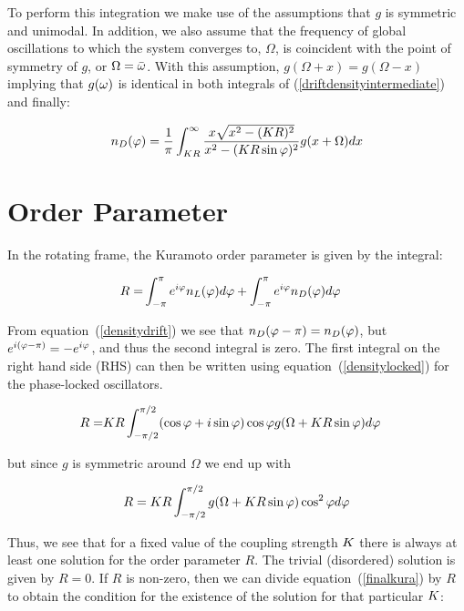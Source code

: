 To perform this integration we make use of the assumptions that $g$ is symmetric and unimodal. In addition, we also assume that the
frequency of global oscillations to which the system converges to, $\Omega$, is coincident with the point of symmetry of $g$, or
$\Omega=\bar{\omega}$. With this assumption, $g(\Omega + x) = g(\Omega - x)$ implying that $g(\omega)$ is identical in both integrals
of (\ref{driftdensityintermediate}) and finally:

\begin{align}
    n_D(\varphi) = \frac{1}{\pi}\int_{K R}^\infty \frac{x\sqrt{x^2 - (K R)^2}}{x^2 - (K R\sin\varphi)^2}g(x+\Omega)dx
    \label{densitydrift}
\end{align}


\section{Order Parameter}


In the rotating frame, the Kuramoto order parameter is given by the integral:

\begin{align}
    R = &\int_{-\pi}^{\pi} e^{i\varphi}n_L(\varphi)d\varphi + \int_{-\pi}^{\pi} e^{i\varphi}n_D(\varphi)d\varphi
\end{align}

From equation~(\ref{densitydrift}) we see that $n_D(\varphi - \pi) = n_D(\varphi)$, but $e^{i(\varphi - \pi)} = -e^{i\varphi}$,
and thus the second integral is zero. The first integral on the right hand side (RHS) can then be written using
equation~(\ref{densitylocked}) for the phase-locked oscillators.

\begin{align}
     R = &K R\int_{-\pi/2}^{\pi/2} (\cos \varphi + i \sin \varphi ) \cos\varphi g(\Omega + K R \sin\varphi) d\varphi
\end{align}

\noindent but since $g$ is symmetric around $\Omega$ we end up with

\begin{align}
     R = K R\int_{-\pi/2}^{\pi/2} g(\Omega + K R \sin\varphi) \cos^2\varphi d\varphi
     \label{finalkura}
\end{align}

Thus, we see that for a fixed value of the coupling strength $K$ there is always at least one solution for the order parameter $R$.
The trivial (disordered) solution is given by $R=0$. If $R$ is non-zero, then we can divide equation~(\ref{finalkura}) by $R$ to obtain
the condition for the existence of the solution for that particular $K$:

